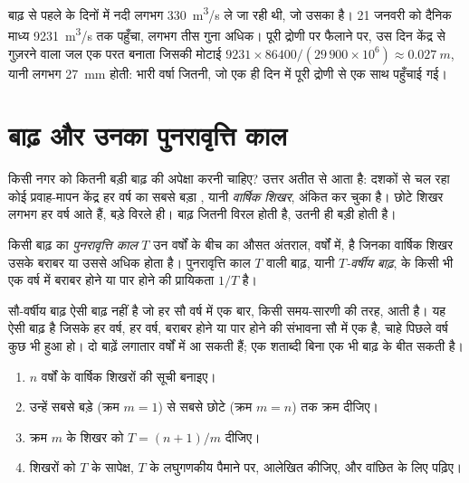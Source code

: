 बाढ़ से पहले के दिनों में नदी लगभग \qty{330}{m^3/s} ले जा रही थी, जो उसका
 है। 21 जनवरी को दैनिक माध्य \qty{9231}{m^3/s} तक पहुँचा, लगभग
तीस गुना अधिक। पूरी द्रोणी पर फैलाने पर, उस दिन केंद्र से गुज़रने वाला
जल एक परत बनाता जिसकी मोटाई
$9231 \times 86400 / (29\,900 \times 10^6) \approx \qty{0.027}{m}$, यानी लगभग
\qty{27}{mm} होती: भारी वर्षा जितनी, जो एक ही दिन में पूरी
द्रोणी से एक साथ पहुँचाई गई।

\section{बाढ़ और उनका पुनरावृत्ति काल}

किसी नगर को कितनी बड़ी बाढ़ की अपेक्षा करनी चाहिए? उत्तर अतीत से आता है: दशकों से
चल रहा कोई प्रवाह-मापन केंद्र हर वर्ष का सबसे बड़ा , यानी
\emph{वार्षिक शिखर}, अंकित कर चुका है। छोटे शिखर लगभग हर वर्ष आते हैं,
बड़े विरले ही। बाढ़ जितनी विरल होती है, उतनी ही बड़ी होती है।

\begin{definition}[पुनरावृत्ति काल]\label{def:g10:drainage-basins:return-period}
किसी बाढ़ का \emph{पुनरावृत्ति काल} $T$ उन वर्षों के बीच का
औसत अंतराल, वर्षों में, है जिनका वार्षिक शिखर उसके बराबर या उससे अधिक होता है।
पुनरावृत्ति काल $T$ वाली बाढ़, यानी \emph{$T$-वर्षीय बाढ़}, के किसी भी एक वर्ष में बराबर होने या
पार होने की प्रायिकता $1/T$ है।
\end{definition}

सौ-वर्षीय बाढ़ ऐसी बाढ़ नहीं है जो हर सौ वर्ष में एक बार, किसी समय-सारणी की तरह,
आती है। यह ऐसी बाढ़ है जिसके हर वर्ष, हर वर्ष, बराबर होने या पार होने की
संभावना सौ में एक है, चाहे पिछले वर्ष कुछ भी हुआ हो। दो बाढ़ें
लगातार वर्षों में आ सकती हैं; एक शताब्दी बिना एक भी बाढ़ के बीत सकती है।

\begin{method}[वार्षिक शिखरों के अभिलेख से पुनरावृत्ति काल]\label{met:g10:drainage-basins:return-periods}
\begin{enumerate}
  \item $n$ वर्षों के वार्षिक शिखरों की सूची बनाइए।
  \item उन्हें सबसे बड़े (क्रम $m = 1$) से सबसे छोटे
        (क्रम $m = n$) तक क्रम दीजिए।
  \item क्रम $m$ के शिखर को  $T = (n + 1)/m$ दीजिए।
  \item शिखरों को $T$ के सापेक्ष, $T$ के लघुगणकीय पैमाने पर, आलेखित कीजिए, और
        वांछित  के लिए  पढ़िए।
\end{enumerate}
\end{method}

